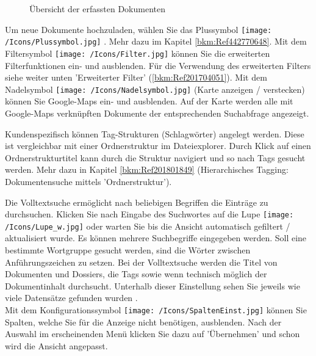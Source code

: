 \begin{figure}[H]
\caption{Übersicht der erfassten Dokumenten}
\end{figure}

Um neue Dokumente hochzuladen, wählen Sie das Plussymbol \texttt{[image: /Icons/Plussymbol.jpg]} . Mehr dazu im Kapitel \ref{bkm:Ref442770648}. Mit dem Filtersymbol \texttt{[image: /Icons/Filter.jpg]}  können Sie die erweiterten Filterfunktionen ein- und ausblenden. Für die Verwendung des erweiterten Filters siehe weiter unten 'Erweiterter Filter' (\ref{bkm:Ref201704051}). Mit dem Nadelsymbol \texttt{[image: /Icons/Nadelsymbol.jpg]} (Karte anzeigen / verstecken) können Sie Google-Maps ein- und ausblenden. Auf der Karte werden alle mit Google-Maps verknüpften Dokumente der entsprechenden Suchabfrage angezeigt.\newline

Kundenspezifisch können Tag-Strukturen (Schlagwörter) angelegt werden. Diese ist vergleichbar mit einer Ordnerstruktur im Dateiexplorer. Durch Klick auf einen Ordnerstrukturtitel  kann durch die Struktur navigiert und so nach Tags gesucht werden. Mehr dazu in Kapitel \ref{bkm:Ref201801849} (Hierarchisches Tagging: Dokumentensuche mittels 'Ordnerstruktur'). \newline

Die Volltextsuche  ermöglicht nach beliebigen Begriffen die Einträge zu durchsuchen. Klicken Sie nach Eingabe des Suchwortes auf die Lupe \texttt{[image: /Icons/Lupe\_w.jpg]}  oder warten Sie bis die Ansicht automatisch gefiltert / aktualisiert wurde. Es können mehrere Suchbegriffe eingegeben werden. Soll eine bestimmte Wortgruppe gesucht werden, sind die Wörter zwischen Anführungszeichen zu setzen. Bei der Volltextsuche werden die Titel von Dokumenten und Dossiers, die Tags sowie wenn technisch möglich der Dokumentinhalt durchsucht. Unterhalb dieser Einstellung sehen Sie jeweils wie viele Datensätze gefunden wurden .\\
Mit dem Konfigurationssymbol \texttt{[image: /Icons/SpaltenEinst.jpg]}  können Sie Spalten, welche Sie für die Anzeige nicht benötigen, ausblenden. Nach der Auswahl im erscheinenden Menü klicken Sie dazu auf 'Übernehmen' und schon wird die Ansicht angepasst. \newline

